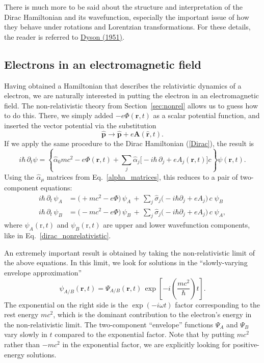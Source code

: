 \documentclass[pra,12pt]{revtex4}
\begin{document}
There is much more to be said about the structure and interpretation
of the Dirac Hamiltonian and its wavefunction, especially the
important issue of how they behave under rotations and Lorentzian
transformations.  For these details, the reader is referred to
\hyperref[cite:dyson]{Dyson (1951)}.

\subsection{Electrons in an electromagnetic field}

Having obtained a Hamiltonian that describes the relativistic dynamics
of a electron, we are naturally interested in putting the electron in
an electromagnetic field.  The non-relativistic theory from
Section~\ref{sec:nonrel} allows us to guess how to do this.  There, we
simply added $-e\Phi(\mathbf{r},t)$ as a scalar potential function,
and inserted the vector potential via the substitution
\begin{equation}
  \hat{\mathbf{p}} \rightarrow \hat{\mathbf{p}}
  + e\mathbf{A}(\hat{\mathbf{r}},t).  
\end{equation}
If we apply the same procedure to the Dirac Hamiltonian (\ref{Dirac}),
the result is
\begin{equation}
  i\hbar \, \partial_t \psi
  = \left\{\hat{\alpha}_0 mc^2 -e\Phi(\mathbf{r},t)
  + \sum_{j} \hat{\alpha}_j \Big[-i\hbar\,\partial_j
    +eA_j(\mathbf{r},t) \Big] c\right\}\psi(\mathbf{r},t).
\end{equation}
Using the $\hat{\alpha}_\mu$ matrices from Eq.~\eqref{alpha_matrices},
this reduces to a pair of two-component equations:
\begin{align}
  i\hbar\, \partial_t \, \psi_A
  &= \big(+mc^2 -e\Phi \big)\,
  \psi_A
  \,+\, \sum_{j} \hat{\sigma}_j \big(-i\hbar\partial_j
    +eA_j \big) \,c\;\psi_B \label{Dirac2a} \\
  i\hbar\, \partial_t \, \psi_B
  &= \big(- mc^2 -e\Phi\big)\,
  \psi_B \,+\, \sum_{j} \hat{\sigma}_j \big(-i\hbar\partial_j
    +eA_j \big)\, c\;\psi_A, \label{Dirac2b}
\end{align}
where $\psi_A(\mathrm{r},t)$ and $\psi_B(\mathrm{r},t)$ are upper and
lower wavefunction components, like in
Eq.~\eqref{dirac_nonrelativistic}.

An extremely important result is obtained by taking the
non-relativistic limit of the above equations.  In this limit, we look
for solutions in the ``slowly-varying envelope approximation''
\begin{equation}
  \psi_{A/B}(\mathbf{r},t) = \Psi_{A/B}(\mathbf{r},t)\,
  \exp\left[-i\left(\frac{mc^2}{\hbar}\right)t\right].
\end{equation}
The exponential on the right side is the $\exp(-i\omega t)$ factor
corresponding to the rest energy $mc^2$, which is the dominant
contribution to the electron's energy in the non-relativistic limit.
The two-component ``envelope'' functions $\Psi_A$ and $\Psi_B$ vary
slowly in $t$ compared to the exponential factor.  Note that by
putting $mc^2$ rather than $-mc^2$ in the exponential factor, we are
explicitly looking for positive-energy solutions.
\end{document}
